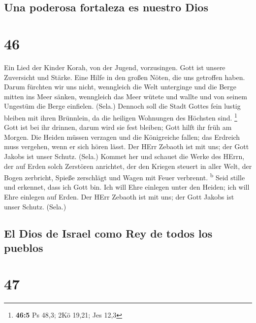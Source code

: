 \hypertarget{una-poderosa-fortaleza-es-nuestro-dios}{%
\subsection{Una poderosa fortaleza es nuestro
Dios}\label{una-poderosa-fortaleza-es-nuestro-dios}}

\hypertarget{section-45}{%
\section{46}\label{section-45}}

 Ein Lied der Kinder Korah, von der Jugend, vorzusingen.
 Gott ist unsere Zuversicht und Stärke. Eine Hilfe in den
großen Nöten, die uns getroffen haben.  Darum fürchten wir
uns nicht, wenngleich die Welt unterginge und die Berge mitten ins Meer
sänken,  wenngleich das Meer wütete und wallte und von
seinem Ungestüm die Berge einfielen. (Sela.)  Dennoch soll
die Stadt Gottes fein lustig bleiben mit ihren Brünnlein, da die
heiligen Wohnungen des Höchsten sind. \footnote{\textbf{46:5} Ps 48,3;
  2Kö 19,21; Jes 12,3}  Gott ist bei ihr drinnen, darum
wird sie fest bleiben; Gott hilft ihr früh am Morgen.  Die
Heiden müssen verzagen und die Königreiche fallen; das Erdreich muss
vergehen, wenn er sich hören lässt.  Der HErr Zebaoth ist
mit uns; der Gott Jakobs ist unser Schutz. (Sela.)  Kommet
her und schauet die Werke des HErrn, der auf Erden solch Zerstören
anrichtet,  der den Kriegen steuert in aller Welt, der
Bogen zerbricht, Spieße zerschlägt und Wagen mit Feuer verbrennt.
\textsuperscript{b}  Seid stille und erkennet, dass ich
Gott bin. Ich will Ehre einlegen unter den Heiden; ich will Ehre
einlegen auf Erden.  Der HErr Zebaoth ist mit uns; der
Gott Jakobs ist unser Schutz. (Sela.)

\hypertarget{el-dios-de-israel-como-rey-de-todos-los-pueblos}{%
\subsection{El Dios de Israel como Rey de todos los
pueblos}\label{el-dios-de-israel-como-rey-de-todos-los-pueblos}}

\hypertarget{section-46}{%
\section{47}\label{section-46}}

